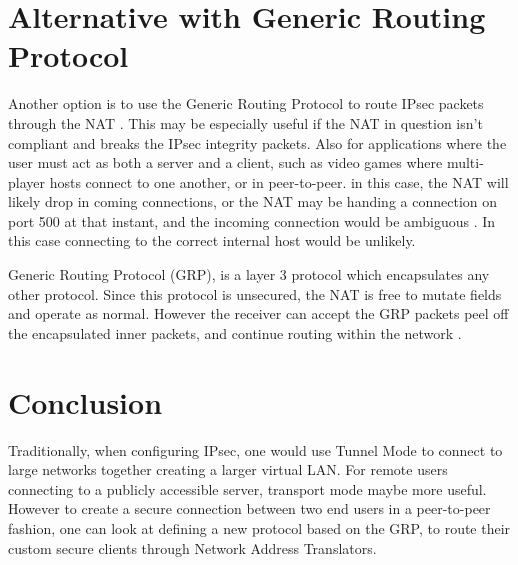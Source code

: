 \documentclass[conference,12pt]{IEEEtran}
\begin{document}
\section{Alternative with Generic Routing Protocol}
Another option is to use the Generic Routing Protocol to route IPsec packets
through the NAT \autocite{rfc2784}. This may be especially useful if the NAT in question isn't
compliant and breaks the IPsec integrity packets.  Also for applications where
the user must act as both a server and a client, such as video games where
multi-player hosts connect to one another, or in peer-to-peer. in this case, the
NAT will likely drop in coming connections, or the NAT may be handing
a connection on port 500 at that instant, and the incoming connection would be
ambiguous \autocite{rfc3715}
. In this case connecting to the correct internal host would be
unlikely. 

Generic Routing Protocol (GRP), is a layer 3 protocol which encapsulates any
other protocol.  Since this protocol is unsecured, the NAT is free to mutate
fields and operate as normal.  However the receiver can accept the GRP packets
peel off the encapsulated inner packets, and continue routing within the
network \autocite{rfc3193}
. 

\section{Conclusion}
Traditionally, when configuring IPsec, one would use Tunnel Mode to connect to
large networks together creating a larger virtual LAN. For remote users
connecting to a publicly accessible server, transport mode maybe more useful.
However to create a secure connection between two end users in a peer-to-peer
fashion, one can look at defining
a new protocol based on the GRP, to route their custom secure clients through
Network Address Translators.


\printbibliography
\end{document}
